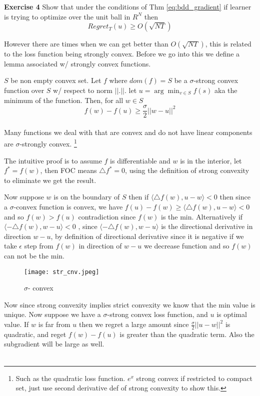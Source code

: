 \documentclass[11pt]{article}
\theoremstyle{quest}
\begin{document}
\begin{tcolorbox}
\textbf{Exercise 4} Show that under the conditions of {\color{blue} Thm \eqref{eq:bdd_gradient}} if learner is trying to optimize over the unit ball in $R^N$ then  $$Regret_T(u)\ge O(\sqrt{NT})$$
\end{tcolorbox}
However there are times when we can get better than $O(\sqrt{NT})$, this is related to the loss function being strongly convex. Before we go into this we define a lemma associated w/ strongly convex functions.
\begin{tcolorbox}
$S$ be non empty convex set. Let $f$ where $dom(f)=S$ be a $\sigma$-strong convex function over $S$ w/ respect to norm $||.||$. let $u= \arg \min_{v\in S} f(s)$ aka the minimum of the function. Then, for all $w\in S$ \[f(w)-f(u)\ge \frac{\sigma}{2}||w-u||^2\]\\

Many functions we deal with that are convex and do not have linear components are $\sigma$-strongly convex. \footnote{Such as the quadratic loss function. $e^{x}$ strong convex if restricted to compact set, just use second derivative def of strong convexity to show this. }
\end{tcolorbox}
The intuitive proof is to assume $f$ is differentiable and $w$ is in the interior, let $f^*=f(w)$, then FOC means $\triangle f^* = 0$, using the definition of strong convexity to eliminate we get the result. 

Now suppose $w$ is on the boundary of $S$ then if $\langle \triangle f(w), u-w\rangle < 0$ then since a $\sigma$-convex function is convex, we have $ f(u)-f(w) \ge \langle \triangle f(w), u-w\rangle < 0$ and so $f(w)>f(u)$ contradiction since $f(w)$ is the min. Alternatively if $\langle -\triangle f(w), w-u\rangle < 0$ , since  $\langle -\triangle f(w), w-u\rangle $ is the directional derivative in direction $w-u$, by definition of directional derivative since it is negative if we take $\epsilon$ step from $f(w)$ in direction of $w-u$ we decrease function and so $f(w)$ can not be the min.
\FloatBarrier
\begin{figure}[!h]
\centering 
\caption{$\sigma$- convex}
\texttt{[image: str\_cnv.jpeg]}
\end{figure}
\FloatBarrier
Now since strong convexity implies strict convexity we know that the min value is unique. Now suppose we have a $\sigma$-strong convex loss function, and $u$ is  optimal value. If $w$ is far from $u$ then we regret a large amount since $\frac{\sigma}{2}||u-w||^2$ is quadratic, and reget $f(w)-f(u)$ is greater than the quadratic term. Also the subgradient will be large as well.\\ \\ 
\end{document}

